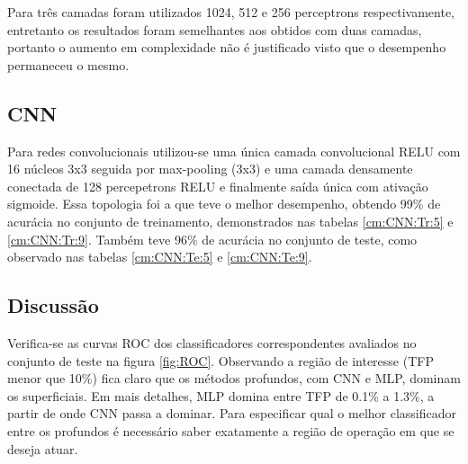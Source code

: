 \begin{table}

\end{table}

Para três camadas foram utilizados 1024, 512 e 256 perceptrons respectivamente, entretanto os resultados foram semelhantes aos obtidos com duas camadas, portanto o aumento em complexidade não é justificado visto que o desempenho permaneceu o mesmo.

\subsection{CNN}
Para redes convolucionais utilizou-se uma única camada convolucional RELU com 16 núcleos 3x3 seguida por max-pooling (3x3) e uma camada densamente conectada de 128 percepetrons RELU e finalmente saída única com ativação sigmoide. Essa topologia foi a que teve o melhor desempenho, obtendo 99\% de acurácia no conjunto de treinamento, demonstrados nas tabelas \ref{cm:CNN:Tr:5} e \ref{cm:CNN:Tr:9}. Também teve 96\% de acurácia no conjunto de teste, como observado nas tabelas \ref{cm:CNN:Te:5} e \ref{cm:CNN:Te:9}.

\begin{table}

\end{table}


\subsection{Discussão}
Verifica-se as curvas ROC dos classificadores correspondentes avaliados no conjunto de teste na figura \ref{fig:ROC}. Observando a região de interesse (TFP menor que 10\%) fica claro que os métodos profundos, com CNN e MLP, dominam os superficiais. Em mais detalhes, MLP domina entre TFP de 0.1\% a 1.3\%, a partir de onde CNN passa a dominar. Para especificar qual o melhor classificador entre os profundos é necessário saber exatamente a região de operação em que se deseja atuar. 

